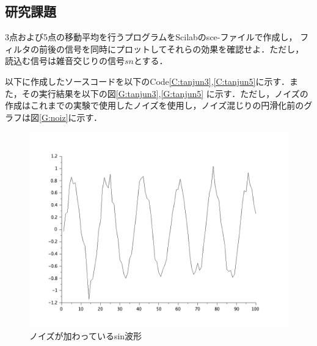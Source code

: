 \documentclass[a4paper,11pt]{jsarticle}
\begin{document}
  \subsection{研究課題}
    \begin{screen}
      3点および5点の移動平均を行うプログラムをScilabのsce-ファイルで作成し，
      フィルタの前後の信号を同時にプロットしてそれらの効果を確認せよ．ただし，
      読込む信号は雑音交じりの信号$sn$とする．
    \end{screen}
    以下に作成したソースコードを以下のCode\ref{C:tanjun3},\ref{C:tanjun5}に示す．また，その実行結果を以下の図\ref{G:tanjun3},\ref{G:tanjun5}
    に示す．ただし，ノイズの作成はこれまでの実験で使用したノイズを使用し，ノイズ混じりの円滑化前のグラフは図\ref{G:noiz}に示す．
    
    
    \begin{figure}[H]
      \centering
      \includegraphics[width=0.8\linewidth]{picture/noiz.png}
      \caption{ノイズが加わっているsin波形}
      \label{G:noizu}
    \end{figure}
\end{document}
